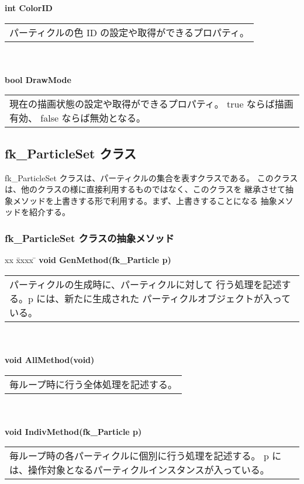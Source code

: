 \begin{tabbing}
\> \textbf{int ColorID} \\
	\> \> \begin{tabular}{p{15cm}}
		パーティクルの色 ID の設定や取得ができるプロパティ。
	\end{tabular} \\ \\

\> \textbf{bool DrawMode} \\
	\> \> \begin{tabular}{p{15cm}}
		現在の描画状態の設定や取得ができるプロパティ。
		true ならば描画有効、
		false ならば無効となる。
	\end{tabular}
\end{tabbing}

\subsection{fk\_ParticleSet クラス} 
fk\_ParticleSet クラスは、パーティクルの集合を表すクラスである。
このクラスは、他のクラスの様に直接利用するものではなく、このクラスを
継承させて抽象メソッドを上書きする形で利用する。まず、上書きすることになる
抽象メソッドを紹介する。
\subsubsection{fk\_ParticleSet クラスの抽象メソッド}
\begin{tabbing}
xx \= xxxx \= \kill
\> \textbf{void GenMethod(fk\_Particle p)} \\
	\> \> \begin{tabular}{p{15cm}}
		パーティクルの生成時に、パーティクルに対して
		行う処理を記述する。p には、新たに生成された
		パーティクルオブジェクトが入っている。
	\end{tabular} \\ \\

\> \textbf{void AllMethod(void)} \\
	\> \> \begin{tabular}{p{15cm}}
		毎ループ時に行う全体処理を記述する。
	\end{tabular} \\ \\

\> \textbf{void IndivMethod(fk\_Particle p)} \\
	\> \> \begin{tabular}{p{15cm}}
		毎ループ時の各パーティクルに個別に行う処理を記述する。
		p には、操作対象となるパーティクルインスタンスが入っている。
	\end{tabular}
\end{tabbing}
